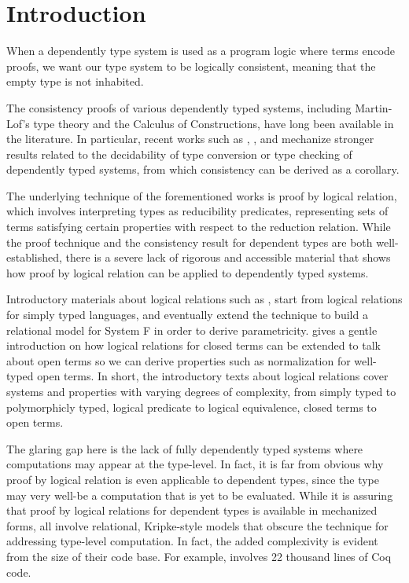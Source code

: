 \documentclass[acmsmall]{acmart}
\begin{document}
\section{Introduction}
When a dependently type system is used as a program logic where terms
encode proofs, we want our type system to be logically consistent,
meaning that the empty type is not inhabited.

The consistency proofs of various dependently typed systems, including Martin-Lof's
type theory and the Calculus of Constructions, have long been
available in the literature. In particular, recent works such as \citet{nbeincoq},
\citet{decagda}, and \citet{martin-lof-a-la-coq} mechanize stronger
results related to the decidability of type conversion or type
checking of dependently typed systems, from which consistency can be
derived as a corollary.

The underlying technique of the forementioned
works is proof by logical relation,
which involves interpreting types as reducibility predicates,
representing sets of terms satisfying certain properties with respect
to the reduction relation. While the proof technique and the
consistency result for dependent types are both well-established,
there is a severe lack of rigorous and accessible material that shows
how proof by logical relation can be applied to dependently typed
systems.

Introductory materials about logical relations such as
\citet{skorstengaard2019introduction}, \citet{harper2016practical}
start from logical relations for simply typed languages, and
eventually extend the technique to build a relational model for System
F in order to derive
parametricity. \citet{harperkripke} gives a gentle introduction on how
logical relations for closed terms can be extended to talk about open
terms so we can derive properties such as normalization for well-typed
open terms. In short, the introductory texts about logical relations
cover systems and properties with varying degrees of complexity, from
simply typed to polymorphicly typed, logical predicate to logical
equivalence, closed terms to open terms.

The glaring gap here is the
lack of fully dependently typed systems where computations may appear
at the type-level. In fact, it is far from obvious why proof by
logical relation is even applicable to dependent types, since the type
may very well-be a computation that is yet to be evaluated.
While it is assuring that proof by logical relations for dependent
types is available in mechanized forms, %
\citet{nbeincoq,decagda,martin-lof-a-la-coq} all involve relational,
Kripke-style models that obscure the technique for addressing
type-level computation. In fact, the added complexivity is evident
from the size of their code base. For example, \citet{nbeincoq}
involves 22 thousand lines of Coq code.
\end{document}
